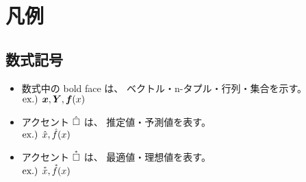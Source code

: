 \chapter*{凡例}
\label{ch:凡例}

\section{数式記号}
\label{s:数式記号}
\begin{itemize}
  \item 数式中の bold face は、
    	ベクトル・n-タプル・行列・集合を示す。
        \\
        $\textrm{ex.) } {\bm{x}}, {\bm{Y}}, {\bm{f}}(x)$
  \item アクセント $\hat{\Box}$ は、
        推定値・予測値を表す。
        \\
        $\textrm{ex.) } \hat{x}, \hat{f}(x)$
  \item アクセント $\accentset{*}{\square}$ は、
    	最適値・理想値を表す。
        \\
        $\textrm{ex.) } \accentset{*}{x}, \accentset{*}{f}(x)$
\end{itemize}
